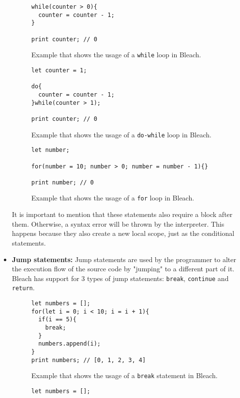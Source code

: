 \begin{itemize}
\begin{figure}[H]
\begin{lstlisting}
while(counter > 0){
  counter = counter - 1;
}

print counter; // 0
    \end{lstlisting}
    \caption{Example that shows the usage of a \texttt{while} loop in Bleach.}
\end{figure}

\begin{figure}[H]
    \centering
    \begin{lstlisting}
let counter = 1;

do{
  counter = counter - 1;
}while(counter > 1);

print counter; // 0
    \end{lstlisting}
    \caption{Example that shows the usage of a \texttt{do-while} loop in Bleach.}
\end{figure}

\begin{figure}[H]
    \centering
    \begin{lstlisting}
let number;

for(number = 10; number > 0; number = number - 1){}

print number; // 0
    \end{lstlisting}
    \caption{Example that shows the usage of a \texttt{for} loop in Bleach.}
\end{figure}

    It is important to mention that these statements also require a block after them. Otherwise, a syntax error will be thrown by the interpreter. This happens because they also create a new local scope, just as the conditional statements.

    \item \textbf{Jump statements:} Jump statements are used by the programmer to alter the execution flow of the source code by "jumping" to a different part of it. Bleach has support for 3 types of jump statements: \texttt{break}, \texttt{continue} and \texttt{return}.

\begin{figure}[H]
    \centering
    \begin{lstlisting}
let numbers = [];
for(let i = 0; i < 10; i = i + 1){
  if(i == 5){
    break;
  }
  numbers.append(i);
}
print numbers; // [0, 1, 2, 3, 4]
    \end{lstlisting}
    \caption{Example that shows the usage of a \texttt{break} statement in Bleach.}
\end{figure}

\begin{figure}[H]
    \centering
    \begin{lstlisting}
let numbers = [];


\end{lstlisting}
\end{figure}
\end{itemize}
